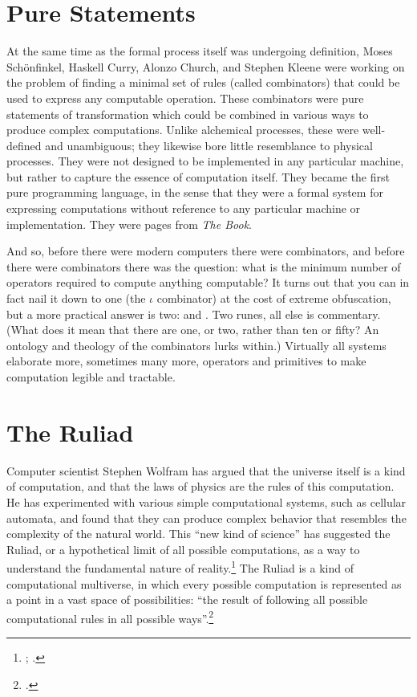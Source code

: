 \section{Pure Statements}

At the same time as the formal process itself was undergoing definition, Moses Schönfinkel, Haskell Curry, Alonzo Church, and Stephen Kleene were working on the problem of finding a minimal set of rules (called combinators) that could be used to express any computable operation.  These combinators were pure statements of transformation which could be combined in various ways to produce complex computations.  Unlike alchemical processes, these were well-defined and unambiguous; they likewise bore little resemblance to physical processes.  They were not designed to be implemented in any particular machine, but rather to capture the essence of computation itself.  They became the first pure programming language, in the sense that they were a formal system for expressing computations without reference to any particular machine or implementation.  They were pages from \emph{The Book}.

And so, before there were modern computers there were combinators, and before there were combinators there was the question:  what is the minimum number of operators required to compute anything computable?  It turns out that you can in fact nail it down to one (the $\iota$ combinator) at the cost of extreme obfuscation, but a more practical answer is two:   and .  Two runes, all else is commentary.  (What does it mean that there are one, or two, rather than ten or fifty?  An ontology and theology of the combinators lurks within.)  Virtually all systems elaborate more, sometimes many more, operators and primitives to make computation legible and tractable.

\section{The Ruliad}

Computer scientist Stephen Wolfram has argued that the universe itself is a kind of computation, and that the laws of physics are the rules of this computation.  He has experimented with various simple computational systems, such as cellular automata, and found that they can produce complex behavior that resembles the complexity of the natural world.  This ``new kind of science'' has suggested the Ruliad, or a hypothetical limit of all possible computations, as a way to understand the fundamental nature of reality.\footnote{\citet{Wolfram2002}; \citet{Wolfram2021}.}  The Ruliad is a kind of computational multiverse, in which every possible computation is represented as a point in a vast space of possibilities:  ``the result of following all possible computational rules in all possible ways''.\footnote{\citet{Wolfram2021}.}

